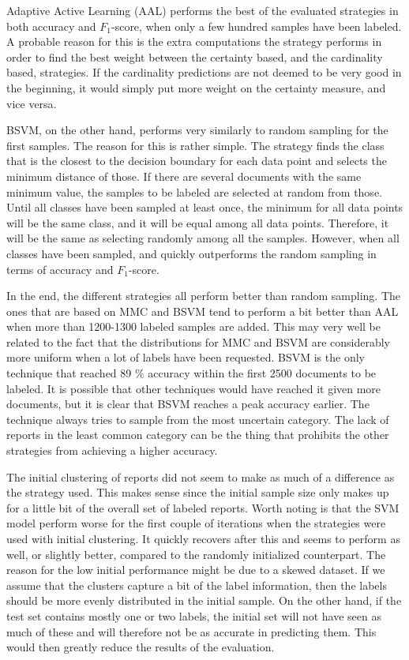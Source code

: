 Adaptive Active Learning (AAL) performs the best of the evaluated strategies in both accuracy and $F_1$-score, when only a few hundred samples have been labeled. 
A probable reason for this is the extra computations the strategy performs in order to find the best weight between the certainty based, and the cardinality based, strategies.
If the cardinality predictions are not deemed to be very good in the beginning, it would simply put more weight on the certainty measure, and vice versa.

BSVM, on the other hand, performs very similarly to random sampling for the first samples.
The reason for this is rather simple.
The strategy finds the class that is the closest to the decision boundary for each data point and selects the minimum distance of those.
If there are several documents with the same minimum value, the samples to be labeled are selected at random from those.
Until all classes have been sampled at least once, the minimum for all data points will be the same class, and it will be equal among all data points.
Therefore, it will be the same as selecting randomly among all the samples.
However, when all classes have been sampled, and quickly outperforms the random sampling in terms of accuracy and $F_1$-score.

In the end, the different strategies all perform better than random sampling.
The ones that are based on MMC and BSVM tend to perform a bit better than AAL when more than 1200-1300 labeled samples are added.
This may very well be related to the fact that the distributions for MMC and BSVM are considerably more uniform when a lot of labels have been requested.
BSVM is the only technique that reached 89 \% accuracy within the first 2500 documents to be labeled.
It is possible that other techniques would have reached it given more documents, but it is clear that BSVM reaches a peak accuracy earlier.
The technique always tries to sample from the most uncertain category.
The lack of reports in the least common category can be the thing that prohibits the other strategies from achieving a higher accuracy.

The initial clustering of reports did not seem to make as much of a difference as the strategy used.
This makes sense since the initial sample size only makes up for a little bit of the overall set of labeled reports.
Worth noting is that the SVM model perform worse for the first couple of iterations when the strategies were used with initial clustering.
It quickly recovers after this and seems to perform as well, or slightly better, compared to the randomly initialized counterpart.
The reason for the low initial performance might be due to a skewed dataset.
If we assume that the clusters capture a bit of the label information, then the labels should be more evenly distributed in the initial sample.
On the other hand, if the test set contains mostly one or two labels, the initial set will not have seen as much of these and will therefore not be as accurate in predicting them.
This would then greatly reduce the results of the evaluation.

